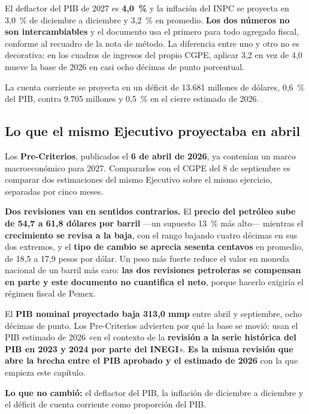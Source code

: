 El deflactor del PIB de 2027 es \textbf{4,0~\%} y la inflación del INPC se proyecta en
3,0~\% de diciembre a diciembre y 3,2~\% en promedio. \textbf{Los dos números no son
intercambiables} y el documento usa el primero para todo agregado fiscal, conforme al
recuadro de la nota de método. La diferencia entre uno y otro no es decorativa: en los
cuadros de ingresos del propio CGPE, aplicar 3,2 en vez de 4,0 mueve la base de 2026 en
casi ocho décimas de punto porcentual.

La cuenta corriente se proyecta en un déficit de 13.681 millones de dólares, 0,6~\% del
PIB, contra 9.705 millones y 0,5~\% en el cierre estimado de 2026.

\subsection*{Lo que el mismo Ejecutivo proyectaba en abril}

Los \textbf{Pre-Criterios}, publicados el \textbf{6 de abril de 2026}, ya contenían un marco
macroeconómico para 2027. Compararlos con el CGPE del 8 de septiembre es comparar dos
estimaciones del mismo Ejecutivo sobre el mismo ejercicio, separadas por cinco meses.



\textbf{Dos revisiones van en sentidos contrarios.} El \textbf{precio del petróleo sube de
54,7 a 61,8 dólares por barril} ---un supuesto 13~\% más alto--- mientras el
\textbf{crecimiento se revisa a la baja}, con el rango bajando cuatro décimas en sus dos
extremos, y el \textbf{tipo de cambio se aprecia sesenta centavos} en promedio, de 18,5 a 17,9
pesos por dólar. Un peso más fuerte reduce el valor en moneda nacional de un barril más caro:
\textbf{las dos revisiones petroleras se compensan en parte y este documento no cuantifica el
neto}, porque hacerlo exigiría el régimen fiscal de Pemex.

El \textbf{PIB nominal proyectado baja 313,0 mmp} entre abril y septiembre, ocho décimas de
punto. Los Pre-Criterios advierten por qué la base se movió: usan el PIB estimado de 2026
«en el contexto de la \textbf{revisión a la serie histórica del PIB en 2023 y 2024 por parte
del INEGI}». \textbf{Es la misma revisión que abre la brecha entre el PIB aprobado y el
estimado de 2026} con la que empieza este capítulo.

\textbf{Lo que no cambió:} el deflactor del PIB, la inflación de diciembre a diciembre y el
déficit de cuenta corriente como proporción del PIB.

